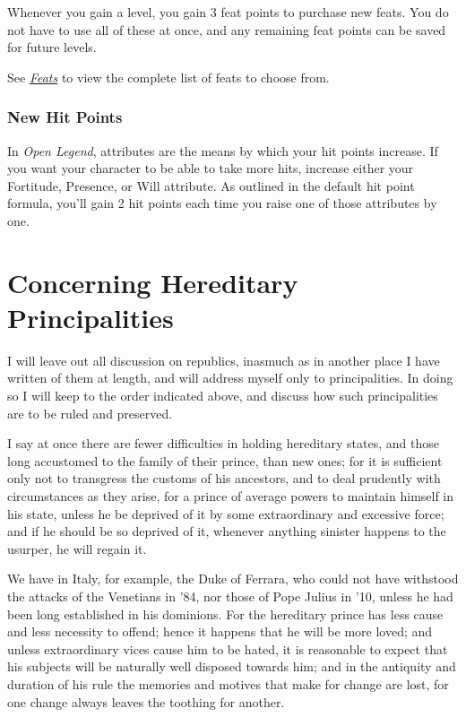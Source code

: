 \documentclass[12pt]{report}
\begin{document}
Whenever you gain a level, you gain 3 feat points to purchase new feats.
You do not have to use all of these at once, and any remaining feat
points can be saved for future levels.

See \href{http://www.openlegendrpg.com/feats}{\emph{Feats}} to view the
complete list of feats to choose from.

\subsection{New Hit Points}\label{new-hit-points}

In \emph{Open Legend}, attributes are the means by which your hit points
increase. If you want your character to be able to take more hits,
increase either your Fortitude, Presence, or Will attribute. As outlined
in the default hit point formula, you'll gain 2 hit points each time you
raise one of those attributes by one.

\chapter{Concerning Hereditary
Principalities}\label{concerning-hereditary-principalities}

I will leave out all discussion on republics, inasmuch as in another
place I have written of them at length, and will address myself only to
principalities. In doing so I will keep to the order indicated above,
and discuss how such principalities are to be ruled and preserved.

I say at once there are fewer difficulties in holding hereditary states,
and those long accustomed to the family of their prince, than new ones;
for it is sufficient only not to transgress the customs of his
ancestors, and to deal prudently with circumstances as they arise, for a
prince of average powers to maintain himself in his state, unless he be
deprived of it by some extraordinary and excessive force; and if he
should be so deprived of it, whenever anything sinister happens to the
usurper, he will regain it.

We have in Italy, for example, the Duke of Ferrara, who could not have
withstood the attacks of the Venetians in '84, nor those of Pope Julius
in '10, unless he had been long established in his dominions. For the
hereditary prince has less cause and less necessity to offend; hence it
happens that he will be more loved; and unless extraordinary vices cause
him to be hated, it is reasonable to expect that his subjects will be
naturally well disposed towards him; and in the antiquity and duration
of his rule the memories and motives that make for change are lost, for
one change always leaves the toothing for another.
\end{document}
